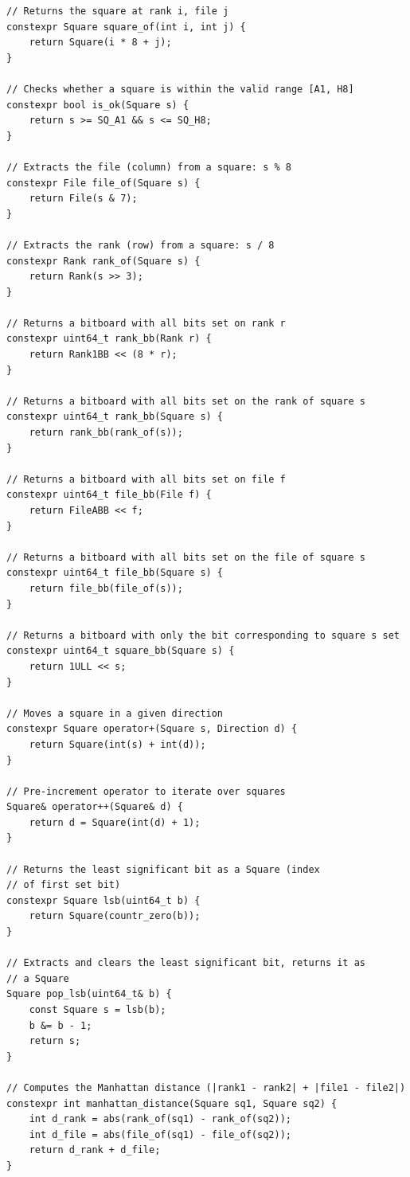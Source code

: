 \documentclass[12pt,a4paper,twoside,openright]{book}
\begin{document}
\begin{mdframed}[skipabove=\baselineskip,topline=false,rightline=false,bottomline=false,leftline=false,linewidth=1pt,linecolor=gray!40,innerleftmargin=8pt]
\begin{verbatim}
// Returns the square at rank i, file j
constexpr Square square_of(int i, int j) {
    return Square(i * 8 + j);
}

// Checks whether a square is within the valid range [A1, H8]
constexpr bool is_ok(Square s) {
    return s >= SQ_A1 && s <= SQ_H8;
}

// Extracts the file (column) from a square: s % 8
constexpr File file_of(Square s) {
    return File(s & 7);
}

// Extracts the rank (row) from a square: s / 8
constexpr Rank rank_of(Square s) {
    return Rank(s >> 3);
}

// Returns a bitboard with all bits set on rank r
constexpr uint64_t rank_bb(Rank r) {
    return Rank1BB << (8 * r);
}

// Returns a bitboard with all bits set on the rank of square s
constexpr uint64_t rank_bb(Square s) {
    return rank_bb(rank_of(s));
}

// Returns a bitboard with all bits set on file f
constexpr uint64_t file_bb(File f) {
    return FileABB << f;
}

// Returns a bitboard with all bits set on the file of square s
constexpr uint64_t file_bb(Square s) {
    return file_bb(file_of(s));
}

// Returns a bitboard with only the bit corresponding to square s set
constexpr uint64_t square_bb(Square s) {
    return 1ULL << s;
}

// Moves a square in a given direction
constexpr Square operator+(Square s, Direction d) {
    return Square(int(s) + int(d));
}

// Pre-increment operator to iterate over squares
Square& operator++(Square& d) {
    return d = Square(int(d) + 1);
}

// Returns the least significant bit as a Square (index 
// of first set bit)
constexpr Square lsb(uint64_t b) {
    return Square(countr_zero(b));
}

// Extracts and clears the least significant bit, returns it as 
// a Square
Square pop_lsb(uint64_t& b) {
    const Square s = lsb(b);
    b &= b - 1;
    return s;
}

// Computes the Manhattan distance (|rank1 - rank2| + |file1 - file2|)
constexpr int manhattan_distance(Square sq1, Square sq2) {
    int d_rank = abs(rank_of(sq1) - rank_of(sq2));
    int d_file = abs(file_of(sq1) - file_of(sq2));
    return d_rank + d_file;
}


\end{verbatim}
\end{mdframed}
\end{document}
